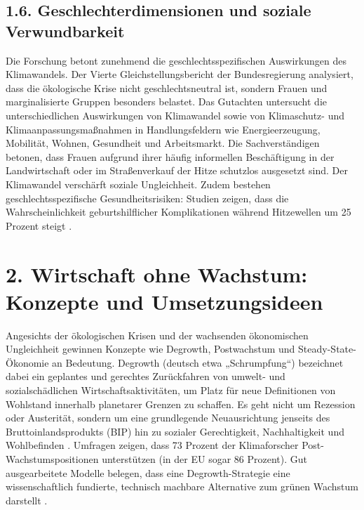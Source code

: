 \documentclass[12pt, a4paper]{article}
\begin{document}
	\subsection*{1.6. Geschlechterdimensionen und soziale Verwundbarkeit}
	Die Forschung betont zunehmend die geschlechtsspezifischen Auswirkungen des
	Klimawandels. Der Vierte Gleichstellungsbericht der Bundesregierung analysiert, dass
	die ökologische Krise nicht geschlechtsneutral ist, sondern Frauen und marginalisierte
	Gruppen besonders belastet. Das Gutachten untersucht die unterschiedlichen Auswirkungen
	von Klimawandel sowie von Klimaschutz- und Klimaanpassungsmaßnahmen in Handlungsfeldern
	wie Energieerzeugung, Mobilität, Wohnen, Gesundheit und Arbeitsmarkt. Die
	Sachverständigen betonen, dass Frauen aufgrund ihrer häufig informellen Beschäftigung
	in der Landwirtschaft oder im Straßenverkauf der Hitze schutzlos ausgesetzt sind.
	Der Klimawandel verschärft soziale Ungleichheit. Zudem bestehen geschlechtsspezifische
	Gesundheitsrisiken: Studien zeigen, dass die Wahrscheinlichkeit geburtshilflicher
	Komplikationen während Hitzewellen um 25 Prozent steigt \cite{gleichstellungsbericht2025}.
	
	\section*{2. Wirtschaft ohne Wachstum: Konzepte und Umsetzungsideen}
	
	Angesichts der ökologischen Krisen und der wachsenden ökonomischen Ungleichheit
	gewinnen Konzepte wie Degrowth, Postwachstum und Steady-State-Ökonomie an Bedeutung.
	Degrowth (deutsch etwa „Schrumpfung“) bezeichnet dabei ein geplantes und gerechtes
	Zurückfahren von umwelt- und sozialschädlichen Wirtschaftsaktivitäten, um Platz für
	neue Definitionen von Wohlstand innerhalb planetarer Grenzen zu schaffen. Es geht
	nicht um Rezession oder Austerität, sondern um eine grundlegende Neuausrichtung
	jenseits des Bruttoinlandsprodukts (BIP) hin zu sozialer Gerechtigkeit, Nachhaltigkeit
	und Wohlbefinden \cite{lse2025}. Umfragen zeigen, dass 73 Prozent der Klimaforscher
	Post-Wachstumspositionen unterstützen (in der EU sogar 86 Prozent). Gut ausgearbeitete
	Modelle belegen, dass eine Degrowth-Strategie eine wissenschaftlich fundierte,
	technisch machbare Alternative zum grünen Wachstum darstellt \cite{greenpeace2025b}.
	
\end{document}
